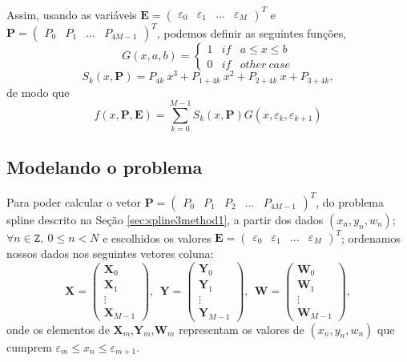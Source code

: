 \documentclass[a4paper,10pt]{article}
\begin{document}
Assim, usando as variáveis 
$\mathbf{E}=\left(\begin{matrix}\varepsilon_0 & \varepsilon_1 & ...  & \varepsilon_{M}\end{matrix}\right)^T$ e
$\mathbf{P}=\left(\begin{matrix}P_0 & P_1 & ...  & P_{4M-1}\end{matrix}\right)^T$,
podemos definir as seguintes funções,
\begin{equation}
 G(x,a,b)= \left\{\begin{matrix}
1 & if &  a \leq x \leq b \\ 
0 & if & other~case
\end{matrix}\right.
\end{equation}
\begin{equation}
 S_k(x,\mathbf{P})=P_{4k}~x^3+P_{1+4k}~x^2+P_{2+4k}~x+P_{3+4k},
\end{equation}
de modo que
\begin{equation}
 f(x,\mathbf{P},\mathbf{E})=\sum_{k=0}^{M-1} S_k(x,\mathbf{P})G(x,\varepsilon_{k},\varepsilon_{k+1})  
\end{equation}

\subsection{Modelando o problema}
\label{subsec:all}
Para poder calcular o vetor $\mathbf{P}=\left(\begin{matrix}P_0 & P_1 & P_2 & ...  & P_{4M-1}\end{matrix}\right)^T$, 
do problema spline descrito  na Seção \ref{sec:spline3method1}, a partir dos dados $(x_n,y_n,w_n)$; 
$\forall n \in \mathtt{Z},~0\leq n < N$ e escolhidos os valores $\mathbf{E}=\left(\begin{matrix}\varepsilon_0 & \varepsilon_1 & ...  & \varepsilon_{M}\end{matrix}\right)^T$;
ordenamos nossos dados nos seguintes vetores coluna:
\begin{equation}
\mathbf{X}=\left(\begin{matrix}\mathbf{X}_0 \\ \mathbf{X}_1 \\ \vdots  \\ \mathbf{X}_{M-1}\end{matrix}\right),~~
\mathbf{Y}=\left(\begin{matrix}\mathbf{Y}_0 \\ \mathbf{Y}_1 \\ \vdots  \\ \mathbf{Y}_{M-1}\end{matrix}\right),~~
\mathbf{W}=\left(\begin{matrix}\mathbf{W}_0 \\ \mathbf{W}_1 \\ \vdots  \\ \mathbf{W}_{M-1}\end{matrix}\right),
\end{equation}
onde os elementos de $\mathbf{X}_m$,$\mathbf{Y}_m$,$\mathbf{W}_m$ representam os valores de $(x_n,y_n,w_n)$
que cumprem $\varepsilon_m \leq x_n \leq \varepsilon_{m+1}$.
\end{document}
